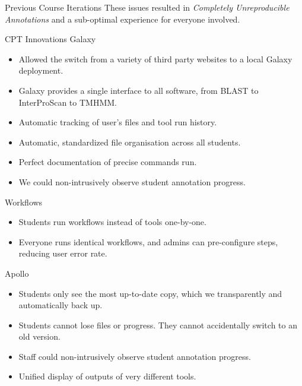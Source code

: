 \documentclass[final,t,20pt]{beamer}
\begin{document}
\begin{frame}[fragile]
\begin{columns}[t]
\begin{column}{.36\linewidth}
\begin{block}{Previous Course Iterations}
                These issues resulted in \emph{Completely Unreproducible Annotations} and a sub-optimal experience for everyone involved.
            \end{block}

            \begin{block}{CPT Innovations}
                Galaxy
                \begin{itemize}
                    \item Allowed the switch from a variety of third party
                        websites to a local Galaxy deployment.
                    \item Galaxy provides a single interface to all software,
                        from BLAST to InterProScan to TMHMM.
                    \item Automatic tracking of user's files and tool run history.
                    \item Automatic, standardized file organisation across all students.
                    \item Perfect documentation of precise commands run.
                    \item We could non-intrusively observe student annotation
                        progress.
                \end{itemize}
                Workflows
                \begin{itemize}
                    \item Students run workflows instead of tools one-by-one.
                    \item Everyone runs identical workflows, and admins can
                        pre-configure steps, reducing user error rate.
                \end{itemize}
                Apollo
                \begin{itemize}
                    \item Students only see the most up-to-date copy, which we
                        transparently and automatically back up.
                    \item Students cannot lose files or progress. They cannot
                        accidentally switch to an old version.
                    \item Staff could non-intrusively observe student
                        annotation progress.
                    \item Unified display of outputs of very different tools.
                \end{itemize}
            \end{block}


\end{column}
\end{columns}
\end{frame}
\end{document}
